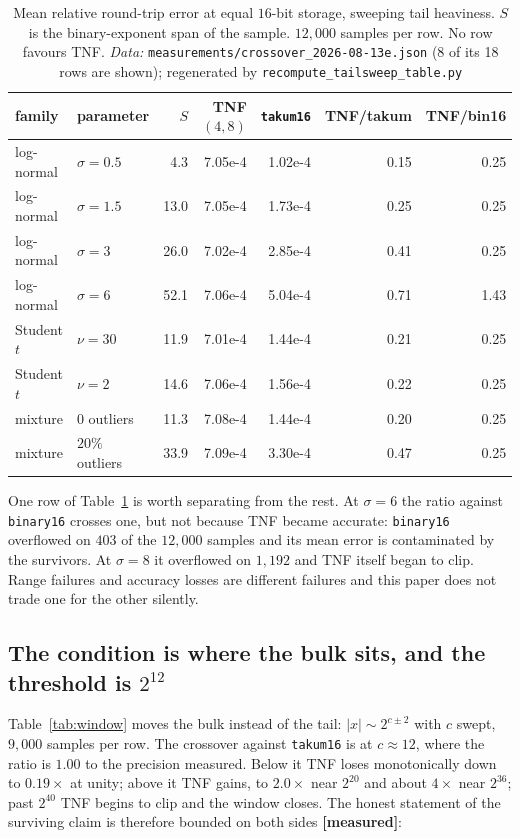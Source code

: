 \documentclass[11pt]{article}
\theoremstyle{definition}
\begin{document}
\begin{table}[htbp]\centering\small
\caption{Mean relative round-trip error at equal $16$-bit storage, sweeping tail
heaviness. $S$ is the binary-exponent span of the sample. $12{,}000$ samples per
row. No row favours TNF. \emph{Data:} \texttt{measurements/crossover\_2026-08-13e.json} (8 of its 18 rows are shown); regenerated by \texttt{recompute\_tailsweep\_table.py}}
\label{tab:tailsweep}
\begin{tabular}{llrrrrr}
\hline
family & parameter & $S$ & TNF$(4,8)$ & \texttt{takum16} & TNF/takum & TNF/bin16 \\
\hline
log-normal & $\sigma=0.5$ & 4.3 & 7.05e-4 & 1.02e-4 & 0.15 & 0.25 \\
log-normal & $\sigma=1.5$ & 13.0 & 7.05e-4 & 1.73e-4 & 0.25 & 0.25 \\
log-normal & $\sigma=3$ & 26.0 & 7.02e-4 & 2.85e-4 & 0.41 & 0.25 \\
log-normal & $\sigma=6$ & 52.1 & 7.06e-4 & 5.04e-4 & 0.71 & 1.43 \\
Student $t$ & $\nu=30$ & 11.9 & 7.01e-4 & 1.44e-4 & 0.21 & 0.25 \\
Student $t$ & $\nu=2$ & 14.6 & 7.06e-4 & 1.56e-4 & 0.22 & 0.25 \\
mixture & $0$ outliers & 11.3 & 7.08e-4 & 1.44e-4 & 0.20 & 0.25 \\
mixture & $20\%$ outliers & 33.9 & 7.09e-4 & 3.30e-4 & 0.47 & 0.25 \\
\hline
\end{tabular}
\end{table}

One row of Table~\ref{tab:tailsweep} is worth separating from the rest. At
$\sigma=6$ the ratio against \texttt{binary16} crosses one, but not because TNF
became accurate: \texttt{binary16} overflowed on $403$ of the $12{,}000$ samples and
its mean error is contaminated by the survivors. At $\sigma=8$ it overflowed on
$1{,}192$ and TNF itself began to clip. Range failures and accuracy losses are
different failures and this paper does not trade one for the other silently.

\subsection{The condition is where the bulk sits, and the threshold is \texorpdfstring{$2^{12}$}{2\textasciicircum 12}}

Table~\ref{tab:window} moves the bulk instead of the tail: $|x|\sim 2^{c\pm 2}$
with $c$ swept, $9{,}000$ samples per row. The crossover against \texttt{takum16}
is at $c\approx 12$, where the ratio is $1.00$ to the precision measured. Below it
TNF loses monotonically down to $0.19\times$ at unity; above it TNF gains, to
$2.0\times$ near $2^{20}$ and about $4\times$ near $2^{36}$; past $2^{40}$ TNF
begins to clip and the window closes. The honest statement of the surviving claim
is therefore bounded on both sides \textbf{[measured]}:
\end{document}
